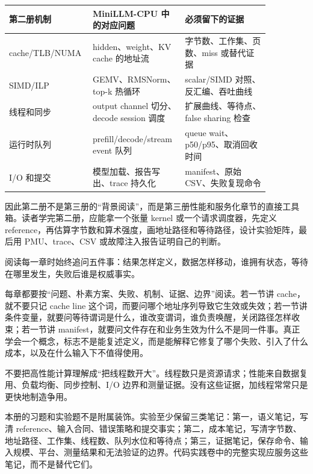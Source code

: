 \begin{center}
\begin{tabular}{p{0.22\linewidth}p{0.33\linewidth}p{0.31\linewidth}}
\toprule
第二册机制 & MiniLLM-CPU 中的对应问题 & 必须留下的证据 \\
\midrule
cache/TLB/NUMA & hidden、weight、KV cache 的地址流 & 字节数、工作集、页数、miss 或替代证据 \\
SIMD/ILP & GEMV、RMSNorm、top-k 热循环 & scalar/SIMD 对照、反汇编、吞吐曲线 \\
线程和同步 & output channel 切分、decode session 调度 & 扩展曲线、等待点、false sharing 检查 \\
运行时队列 & prefill/decode/stream event 队列 & queue wait、p50/p95、取消回收时间 \\
I/O 和提交 & 模型加载、报告写出、trace 持久化 & manifest、原始 CSV、失败复现命令 \\
\bottomrule
\end{tabular}
\end{center}

因此第二册不是第三册的“背景阅读”，而是第三册性能和服务化章节的直接工具箱。读者学完第二册，应能拿一个张量 kernel 或一个请求调度器，先定义 reference，再估算字节数和算术强度，画地址路径和等待路径，设计实验矩阵，最后用 PMU、trace、CSV 或故障注入报告证明自己的判断。

\begin{mentalmodel}
阅读每一章时始终追问五件事：结果怎样定义，数据怎样移动，谁拥有状态，等待在哪里发生，失败后谁是权威事实。
\end{mentalmodel}

每章都要按“问题、朴素方案、失败、机制、证据、边界”阅读。若一节讲 cache，就不要只记 cache line 这个词，而要问哪个地址序列导致它生效或失效；若一节讲条件变量，就要问等待谓词是什么，谁改变谓词，谁负责唤醒，关闭路径怎样收束；若一节讲 manifest，就要问文件存在和业务生效为什么不是同一件事。真正学会一个概念，标志不是能复述定义，而是能解释它修复了哪个失败、引入了什么成本，以及在什么输入下不值得使用。

\begin{warningbox}
不要把高性能计算理解成“把线程数开大”。线程数只是资源请求；性能来自数据复用、负载均衡、同步控制、I/O 边界和测量证据。没有这些证据，加线程常常只是更快地制造争用。
\end{warningbox}

本册的习题和实验题不是附属装饰。实验至少保留三类笔记：第一，语义笔记，写清 reference、输入合同、错误策略和提交事实；第二，成本笔记，写清字节数、地址路径、工作集、线程数、队列水位和等待点；第三，证据笔记，保存命令、输入规模、平台、测量结果和无法验证的边界。代码实践卷中的完整实现应服务这些笔记，而不是替代它们。

